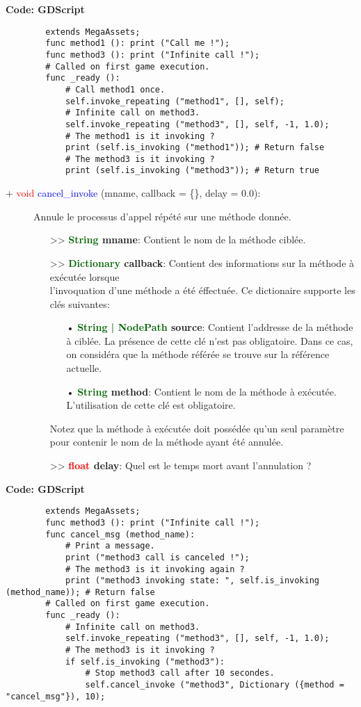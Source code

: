 \documentclass[a4paper, 11pt]{article}
\begin{document}
	\newpage \textbf{Code: GDScript}
	\begin{lstlisting}
		extends MegaAssets;
		func method1 (): print ("Call me !");
		func method3 (): print ("Infinite call !");
		# Called on first game execution.
		func _ready ():
			# Call method1 once.
			self.invoke_repeating ("method1", [], self);
			# Infinite call on method3.
			self.invoke_repeating ("method3", [], self, -1, 1.0);
			# The method1 is it invoking ?
			print (self.is_invoking ("method1")); # Return false
			# The method3 is it invoking ?
			print (self.is_invoking ("method3")); # Return true
	\end{lstlisting}
	\begin{description}
		\item [+ \textcolor{red}{void} \textcolor{blue}{cancel\_invoke} (mname, callback = \{\}, delay =
		0.0):] Annule le processus d'appel répété sur une méthode donnée.
		\begin{itemize}
			\item [>> \textbf{\textcolor{darkgreen}{String} mname}:] Contient le nom de la méthode ciblée.
			\item [>> \textbf{\textcolor{darkgreen}{Dictionary} callback}:] Contient des informations sur la
			méthode à exécutée lorsque \\l'invoquation d'une méthode a été éffectuée. Ce dictionaire
			supporte les clés suivantes:
			\begin{itemize}
			   \item[• \textbf{\textcolor{darkgreen}{String | NodePath} source}:] Contient l'addresse de la
			   méthode à ciblée. La présence de cette clé n'est pas obligatoire. Dans ce cas, on considéra
			   que la méthode référée se trouve sur la référence actuelle.
			   \item[• \textbf{\textcolor{darkgreen}{String} method}:] Contient le nom de la méthode à 
			   exécutée. L'utilisation de cette clé est obligatoire.
			\end{itemize}
			Notez que la méthode à exécutée doit possédée qu'un seul paramètre pour contenir le nom de la
			méthode ayant été annulée.
			\item [>> \textbf{\textcolor{red}{float} delay}:] Quel est le temps mort avant l'annulation ?\\
		\end{itemize}
	\end{description}
	\textbf{Code: GDScript}
	\begin{lstlisting}
		extends MegaAssets;
		func method3 (): print ("Infinite call !");
		func cancel_msg (method_name):
			# Print a message.
			print ("method3 call is canceled !");
			# The method3 is it invoking again ?
			print ("method3 invoking state: ", self.is_invoking (method_name)); # Return false
		# Called on first game execution.
		func _ready ():
			# Infinite call on method3.
			self.invoke_repeating ("method3", [], self, -1, 1.0);
			# The method3 is it invoking ?
			if self.is_invoking ("method3"):
				# Stop method3 call after 10 secondes.
				self.cancel_invoke ("method3", Dictionary ({method = "cancel_msg"}), 10);
	\end{lstlisting}
\end{document}
